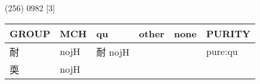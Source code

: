 \documentclass[14pt,a4paper]{scrartcl}
\begin{document}
(256) 0982 {[}3{]}

\begin{longtable}[c]{@{}llllll@{}}
\toprule
\begin{minipage}[b]{0.14\columnwidth}\raggedright\strut
GROUP
\strut\end{minipage} &
\begin{minipage}[b]{0.14\columnwidth}\raggedright\strut
MCH
\strut\end{minipage} &
\begin{minipage}[b]{0.14\columnwidth}\raggedright\strut
qu
\strut\end{minipage} &
\begin{minipage}[b]{0.14\columnwidth}\raggedright\strut
other
\strut\end{minipage} &
\begin{minipage}[b]{0.14\columnwidth}\raggedright\strut
none
\strut\end{minipage} &
\begin{minipage}[b]{0.14\columnwidth}\raggedright\strut
PURITY
\strut\end{minipage}\tabularnewline
\midrule
\endhead
\begin{minipage}[t]{0.14\columnwidth}\raggedright\strut
耐
\strut\end{minipage} &
\begin{minipage}[t]{0.14\columnwidth}\raggedright\strut
nojH
\strut\end{minipage} &
\begin{minipage}[t]{0.14\columnwidth}\raggedright\strut
耐 nojH
\strut\end{minipage} &
\begin{minipage}[t]{0.14\columnwidth}\raggedright\strut
\strut\end{minipage} &
\begin{minipage}[t]{0.14\columnwidth}\raggedright\strut
\strut\end{minipage} &
\begin{minipage}[t]{0.14\columnwidth}\raggedright\strut
pure:qu
\strut\end{minipage}\tabularnewline
\begin{minipage}[t]{0.14\columnwidth}\raggedright\strut
耎
\strut\end{minipage} &
\begin{minipage}[t]{0.14\columnwidth}\raggedright\strut
nojH
\strut\end{minipage} &
\begin{minipage}[t]{0.14\columnwidth}\raggedright\strut
\strut\end{minipage} &

\end{longtable}
\end{document}
